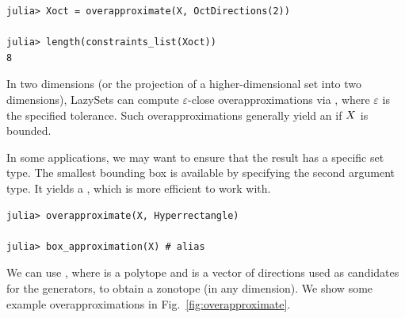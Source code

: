 \begin{minipage}{\linewidth}
\begin{lstlisting}
julia> Xoct = overapproximate(X, OctDirections(2))

julia> length(constraints_list(Xoct))
8
\end{lstlisting}
\end{minipage}

In two dimensions (or the projection of a higher-dimensional set into two dimensions), LazySets can compute $\varepsilon$-close overapproximations via , where $\varepsilon$ is the specified tolerance.
%
Such overapproximations generally yield an  if $X$ is bounded.

\smallskip

In some applications, we may want to ensure that the result has a specific set type.
The smallest bounding box is available by specifying the second argument type. It yields a , which is more efficient to work with.

\begin{minipage}{\linewidth}
	\begin{lstlisting}
julia> overapproximate(X, Hyperrectangle)

julia> box_approximation(X) # alias
\end{lstlisting}
\end{minipage}

We can use , where  is a polytope and  is a vector of directions used as candidates for the generators, to obtain a zonotope (in any dimension). We show some example overapproximations in Fig.~\ref{fig:overapproximate}.
